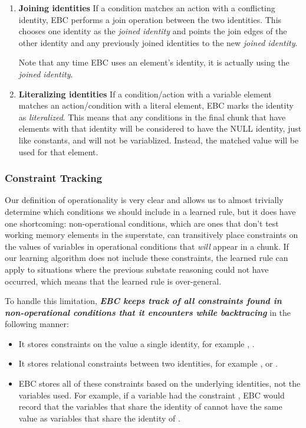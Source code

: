 \begin{enumerate}
	\item \textbf{Joining identities} \newline
	If a condition matches an action with a conflicting identity, EBC performs a join operation between the two identities. This chooses one identity as the \textit{joined identity} and points the join edges of the other identity and any previously joined identities to the new \textit{joined identity}.

	Note that any time EBC uses an element's identity, it is actually using the \textit{joined identity}.

	\item \textbf{Literalizing identities} \newline
	If a condition/action with a variable element matches an action/condition with a literal element, EBC marks the identity as \textit{literalized}.  This means that any conditions in the final chunk that have elements with that identity will be considered to have the NULL identity, just like constants, and will not be variablized.  Instead, the matched value will be used for that element.
\end{enumerate}

\subsubsection{Constraint Tracking}

Our definition of operationality is very clear and allows us to almost trivially determine which conditions we should include in a learned rule, but it does have one shortcoming: non-operational conditions, which are ones that don't test working memory elements in the superstate, can transitively place constraints on the values of variables in operational conditions that \textit{will} appear in a chunk.  If our learning algorithm does not include these constraints, the learned rule can apply to situations where the previous substate reasoning could not have occurred, which means that the learned rule is over-general.

To handle this limitation, \textbf{\textit{EBC keeps track of all constraints found in \\ non-operational conditions that it encounters while backtracing}} in the following manner:

\begin{itemize}
	\item It stores constraints on the value a single identity, for example , .
	\item It stores relational constraints between two identities, for example ,   or  .
	\item EBC stores all of these constraints based on the underlying identities, not the variables used.  For example, if a variable  had the constraint , EBC would record that the variables that share the identity of  cannot have the same value as variables that share the identity of .
\end{itemize}

